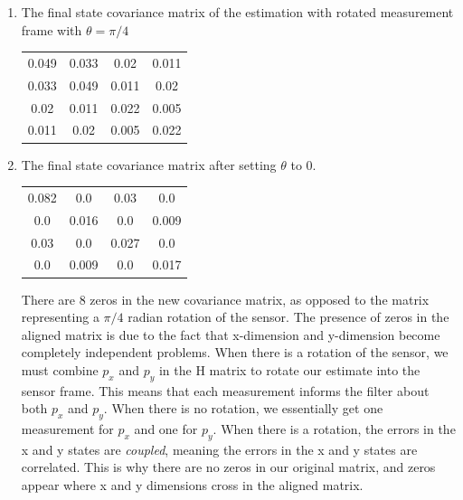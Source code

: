 \documentclass[11pt, letterpaper, twocolumn]{article}
\begin{document}
\begin{enumerate}

\item The final state covariance matrix of the estimation with
rotated measurement frame with $\theta = \pi/4$

    \begin{center}
        \begin{tabular}{cccc}
            \hline
            0.049 & 0.033 & 0.02 & 0.011 \\
            0.033 & 0.049 & 0.011 & 0.02 \\
            0.02 & 0.011 & 0.022 & 0.005 \\
            0.011 & 0.02 & 0.005 & 0.022 \\
            \hline
        \end{tabular}
    \end{center}

\item The final state covariance matrix after setting $\theta$ to 0. 

    \begin{center}
        \begin{tabular}{cccc}
            \hline
            0.082 & 0.0 & 0.03 & 0.0 \\
            0.0 & 0.016 & 0.0 & 0.009 \\
            0.03 & 0.0 & 0.027 & 0.0 \\
            0.0 & 0.009 & 0.0 & 0.017 \\
            \hline
        \end{tabular}
    \end{center}
    There are 8 zeros in the new covariance matrix, as opposed to the
    matrix representing a $\pi/4$ radian rotation of the sensor. The
    presence of zeros in the aligned matrix is due to the fact that 
    x-dimension and y-dimension become completely independent problems.
    When there is a rotation of the sensor, we must combine $p_x$ and
    $p_y$ in the H matrix to rotate our estimate into the sensor frame.
    This means that each measurement informs the filter about both
    $p_x$ and $p_y$. When there is no rotation, we essentially get 
    one measurement for $p_x$ and one for $p_y$. When there is a rotation,
    the errors in the x and y states are \textit{coupled}, meaning the
    errors in the x and y states are correlated. This is why there are
    no zeros in our original matrix, and zeros appear where x and y
    dimensions cross in the aligned matrix.


\end{enumerate}
\end{document}
